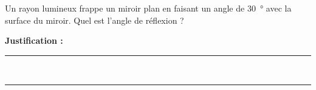 Un rayon lumineux frappe un miroir plan en faisant un angle de \qty{30}{\degree} avec la surface du miroir. Quel est l'angle de réflexion ?

\choices

\noindent\textbf{Justification :} \hrulefill \\[2.5ex]
\rule{\linewidth}{0.4pt} \\[2.5ex]
\rule{\linewidth}{0.4pt}
\vfill
